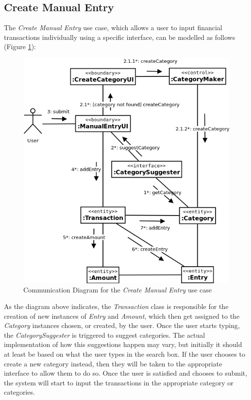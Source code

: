 \subsection{Create Manual Entry} \label{sec:AnalysisAndDesign.ManualEntry}

The \emph{Create Manual Entry} use case, which allows a
user to input financial transactions individually using a specific interface,
can be modelled as follows (Figure \ref{fig:CommDiagram.CreateManualEntry}):
\begin{figure}[ht!]
  \begin{center}
    \includegraphics[width=16cm]{./contents/img/Comm_Diagram_-_Manual_Entry.png}
  \end{center}
  \caption{Communication Diagram for the \emph{Create Manual Entry} use case}
  \label{fig:CommDiagram.CreateManualEntry}
\end{figure}
\FloatBarrier

As the diagram above indicates, the \emph{Transaction} class is responsible for
the creation of new instances of \emph{Entry} and \emph{Amount}, which then get
assigned to the \emph{Category} instances chosen, or created, by the user.
Once the user starts typing, the \emph{CategorySuggester} is triggered to
suggest categories. The actual implementation of how this suggestions happen
may vary, but initially it should at least be based on what the user types in
the search box. If the user chooses to create a new category instead, then they
will be taken to the appropriate interface to allow them to do so. Once the
user is satisfied and chooses to submit, the system will start to input the
transactions in the appropriate category or categories.

